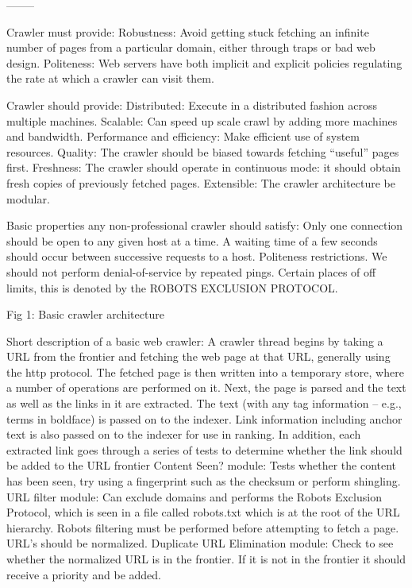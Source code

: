 --------

Crawler must provide:
Robustness: Avoid getting stuck fetching an infinite number of pages from a particular domain, either through traps or bad web design.
Politeness: Web servers have both implicit and explicit policies regulating the rate at which a crawler can visit them. 

Crawler should provide:
Distributed: Execute in a distributed fashion across multiple machines.
Scalable: Can speed up scale crawl by adding more machines and bandwidth.
Performance and efficiency: Make efficient use of system resources. 
Quality: The crawler should be biased towards fetching “useful” pages first.
Freshness: The crawler should operate in continuous mode: it should obtain fresh copies of previously fetched pages.
Extensible: The crawler architecture be modular.

Basic properties any non-professional crawler should satisfy:
 Only one connection should be open to any given host at a time.
 A waiting time of a few seconds should occur between successive requests to a host.
Politeness restrictions. We should not perform denial-of-service by repeated pings. Certain places of off limits, this is denoted by the ROBOTS EXCLUSION PROTOCOL.

Fig 1: Basic crawler architecture

Short description of a basic web crawler:
A crawler thread begins by taking a URL from the frontier and fetching the web page at that URL, generally using the http protocol. The fetched page is then written into a temporary store, where a number of operations are performed on it. Next, the page is parsed and the text as well as the links in it are extracted. The text (with any tag information – e.g., terms in boldface) is passed on to the indexer. Link information including anchor text is also passed on to the indexer for use in ranking. In addition, each extracted link goes through a series of tests to determine whether the link should be added to the URL frontier
Content Seen? module: Tests whether the content has been seen, try using a fingerprint such as the checksum or perform shingling.
URL filter module: Can exclude domains and performs the Robots Exclusion Protocol, which is seen in a file called robots.txt which is at the root of the URL hierarchy. Robots filtering must be performed before attempting to fetch a page. URL’s should be normalized. 
Duplicate URL Elimination module: Check to see whether the normalized URL is in the frontier. If it is not in the frontier it should receive a priority and be added.


